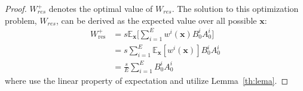 \begin{proof}


\( W_{res}^+ \) denotes the optimal value of \( W_{res} \).
The solution to this optimization problem, \( W_{res} \), can be derived as the expected value over all possible \( \mathbf{x} \):
\vspace{-5pt}
\begin{align}
W_{\text{res}}^+ &= s \mathbb{E}_{\mathbf{x}} \Biggl[ \sum_{i=1}^E w^i(\mathbf{x}) B^i_0 A^i_0 \Biggr] \label{eq:tmp1}\\ 
&= s \sum_{i=1}^E \mathbb{E}_{\mathbf{x}} [ w^i(\mathbf{x}) ] B^i_0A^i_0 \label{eq:tmp2}\\&=   \frac{s}{E} \sum_{i=1}^E B^i_0 A^i_0 
\end{align}
where  use the linear property of expectation and  utilize Lemma~\ref{th:lema}.




\end{proof}

